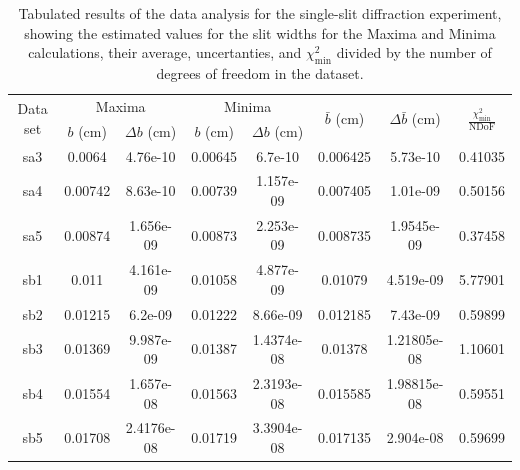 \documentclass[a4paper]{article}
\begin{document}
\begin{table}[]
  \centering
  \begin{tabular}{|c|cc|cc|c|c|c|}\hline
  \multirow{2}{*}{Data set} & \multicolumn{2}{c|}{Maxima} & \multicolumn{2}{c|}{Minima} & \multirow{2}{*}{$\bar b$ (cm)} & \multirow{2}{*}{$\Delta\bar{b}$ (cm)} & \multirow{2}{*}{$\frac{\chi^2_\text{min}}{\text{NDoF}}$} \\
                       & $b$ (cm) & $\Delta b$ (cm) & $b$ (cm) & $\Delta b$ (cm)   &                     &                      &                      \\\hline\hline
  sa3                    & 0.0064     & 4.76e-10      & 0.00645    & 6.7e-10       & 0.006425            & 5.73e-10             & 0.41035              \\
  sa4                    & 0.00742    & 8.63e-10      & 0.00739    & 1.157e-09     & 0.007405            & 1.01e-09             & 0.50156              \\
  sa5                    & 0.00874    & 1.656e-09     & 0.00873    & 2.253e-09     & 0.008735            & 1.9545e-09           & 0.37458              \\
  sb1                    & 0.011      & 4.161e-09     & 0.01058    & 4.877e-09     & 0.01079             & 4.519e-09            & 5.77901              \\
  sb2                    & 0.01215    & 6.2e-09       & 0.01222    & 8.66e-09      & 0.012185            & 7.43e-09             & 0.59899              \\
  sb3                    & 0.01369    & 9.987e-09     & 0.01387    & 1.4374e-08    & 0.01378             & 1.21805e-08          & 1.10601              \\
  sb4                    & 0.01554    & 1.657e-08     & 0.01563    & 2.3193e-08    & 0.015585            & 1.98815e-08          & 0.59551              \\
  sb5                    & 0.01708    & 2.4176e-08    & 0.01719    & 3.3904e-08    & 0.017135            & 2.904e-08            & 0.59699      \\\hline       
  \end{tabular}
  \captionsetup{justification=centering}
  \caption{Tabulated results of the data analysis for the single-slit diffraction experiment, showing the estimated values for the slit widths for the Maxima and Minima calculations, their average, uncertanties, and $\chi^2_\text{min}$ divided by the number of degrees of freedom in the dataset.}
  \label{tab:ss_results}
  \end{table}
\end{document}
